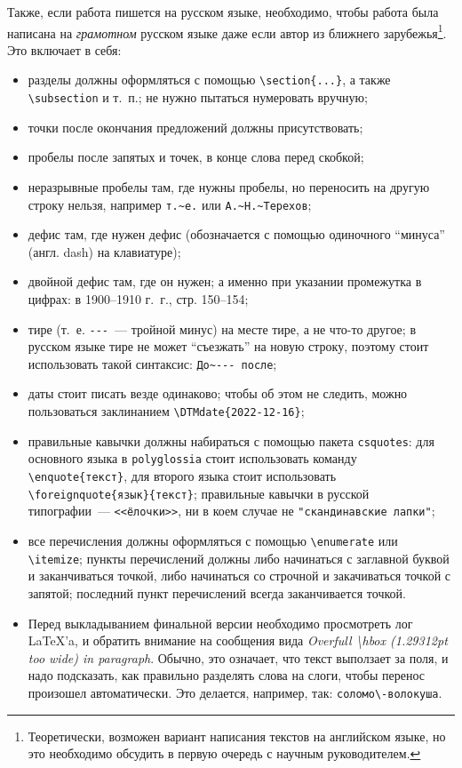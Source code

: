 Также, если работа пишется на русском языке, необходимо, чтобы работа была написана на \textit{грамотном} русском языке даже если автор из ближнего зарубежья\footnote{
    Теоретически, возможен вариант написания текстов на английском языке, но это необходимо обсудить в первую очередь с научным руководителем.}.
Это включает в себя:
\begin{itemize}
    \item разделы должны оформляться с помощью \verb=\section{...}=, а также \verb=\subsection= и т.~п.; не нужно пытаться нумеровать вручную;
    \item точки после окончания предложений должны присутствовать;
    \item пробелы после запятых и точек, в конце слова перед скобкой;
    \item неразрывные пробелы там, где нужны пробелы, но переносить на другую строку нельзя, например \verb=т.~е.= или \verb=А.~Н.~Терехов=;
    \item дефис там, где нужен дефис (обозначается с помощью одиночного \enquote{минуса} (англ. dash) на клавиатуре);
    \item двойной дефис там, где он нужен; а именно  при указании проме\-жутка в цифрах: в 1900--1910 г.~г., стр. 150--154;
    \item тире (т.~е. \verb=---=~--- тройной минус) на месте тире, а не что-то другое; в русском языке тире не может \enquote{съезжать} на новую строку, поэтому стоит использовать такой синтаксис: \verb=До~--- после=;
    \item даты стоит писать везде одинаково; чтобы об этом не следить, можно пользоваться заклинанием \verb=\DTMdate{2022-12-16}=;
    \item правильные кавычки должны набираться с помощью пакета \texttt{csquotes}: для основного языка в \texttt{polyglossia} стоит использовать команду \verb=\enquote{текст}=, для второго языка стоит использовать \verb=\foreignquote{язык}{текст}=; правильные кавычки в русской типографии~--- \verb=<<ёлочки>>=, ни в коем случае не \verb="скандинавские лапки"=;
    \item все перечисления должны оформляться с помощью \verb=\enumerate= или \verb=\itemize=; пункты перечислений должны либо начинаться с заглавной буквой и заканчиваться точкой, либо начинаться со строчной и закачиваться точкой с запятой; последний пункт пере\-числений всегда заканчивается точкой.
    \item Перед выкладыванием финальной версии необходимо просмотреть лог \LaTeX'a, и обратить внимание на сообщения вида \emph{Overfull \textbackslash hbox (1.29312pt too wide) in paragraph}. Обычно, это означает, что текст выползает за поля, и надо подсказать, как правильно разделять слова на слоги, чтобы перенос произошел автоматически. Это делается, например, так: \verb=соломо\-волокуша=.
\end{itemize}

